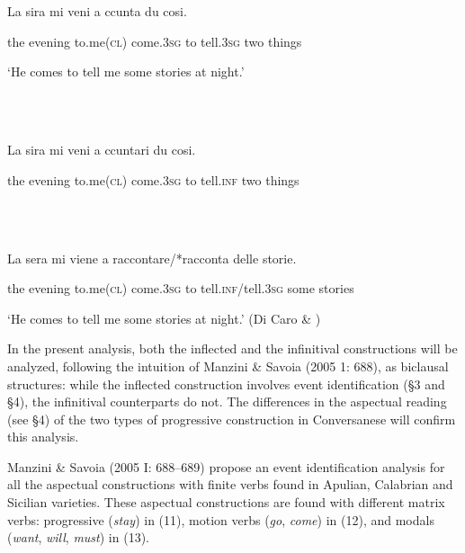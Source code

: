 \documentclass[output=paper]{langsci/langscibook}
\begin{document}
\ea%
    \label{ex:key:8}
    \gll\\
        \\
    \glt
    \z

          La  sira    mi    veni    a  ccunta    du   cosi.

the  evening  to.me\textsc{(cl)}  come.\textsc{3sg}  to tell.\textsc{3sg} two  things

‘He comes to tell me some stories at night.’

\ea%
    \label{ex:key:9}
    \gll\\
        \\
    \glt
    \z

          La  sira    mi    veni     a  ccuntari  du   cosi. 

the  evening  to.me\textsc{(cl)}  come.\textsc{3sg}  to  tell.\textsc{inf} two  things

\ea%
    \label{ex:key:10}
    \gll\\
        \\
    \glt
    \z

          La  sera    mi    viene     a   raccontare/*racconta  delle  storie.

the  evening  to.me\textsc{(cl)} come.\textsc{3sg}  to  tell.\textsc{inf}/tell.\textsc{3sg}  some  stories

‘He comes to tell me some stories at night.’ (Di Caro \& \citealt{Giusti2015}) 

In the present analysis, both the inflected and the infinitival constructions will be analyzed, following the intuition of Manzini \& Savoia (2005 1: 688), as biclausal structures: while the inflected construction involves event identification (§3 and §4), the infinitival counterparts do not. The differences in the aspectual reading (see §4) of the two types of progressive construction in Conversanese will confirm this analysis.

Manzini \& Savoia (2005 I: 688–689) propose an event identification analysis for all the aspectual constructions with finite verbs found in Apulian, Calabrian and Sicilian varieties. These aspectual constructions are found with different matrix verbs: progressive (\textit{stay}) in (11), motion verbs (\textit{go}, \textit{come}) in (12), and modals (\textit{want}, \textit{will}, \textit{must}) in (13).

\ea%
    \label{ex:key:11}
    \gll\\
        \\
    \glt
    \z
\end{document}
